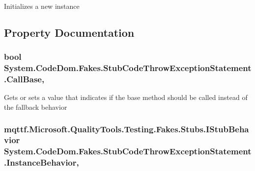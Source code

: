 Initializes a new instance



\subsection{Property Documentation}
\hypertarget{class_system_1_1_code_dom_1_1_fakes_1_1_stub_code_throw_exception_statement_a5ae2b8955931985234b95dfae1396020}{
\subsubsection[{Call\-Base}]{\setlength{\rightskip}{0pt plus 5cm}bool System.\-Code\-Dom.\-Fakes.\-Stub\-Code\-Throw\-Exception\-Statement.\-Call\-Base\hspace{0.3cm}{\ttfamily [get]}, {\ttfamily [set]}}}\label{class_system_1_1_code_dom_1_1_fakes_1_1_stub_code_throw_exception_statement_a5ae2b8955931985234b95dfae1396020}


Gets or sets a value that indicates if the base method should be called instead of the fallback behavior

\hypertarget{class_system_1_1_code_dom_1_1_fakes_1_1_stub_code_throw_exception_statement_a42d3b4f818c6d4215adb725af26df0c4}{
\subsubsection[{Instance\-Behavior}]{\setlength{\rightskip}{0pt plus 5cm}mqttf.\-Microsoft.\-Quality\-Tools.\-Testing.\-Fakes.\-Stubs.\-I\-Stub\-Behavior System.\-Code\-Dom.\-Fakes.\-Stub\-Code\-Throw\-Exception\-Statement.\-Instance\-Behavior\hspace{0.3cm}{\ttfamily [get]}, {\ttfamily [set]}}}\label{class_system_1_1_code_dom_1_1_fakes_1_1_stub_code_throw_exception_statement_a42d3b4f818c6d4215adb725af26df0c4}


